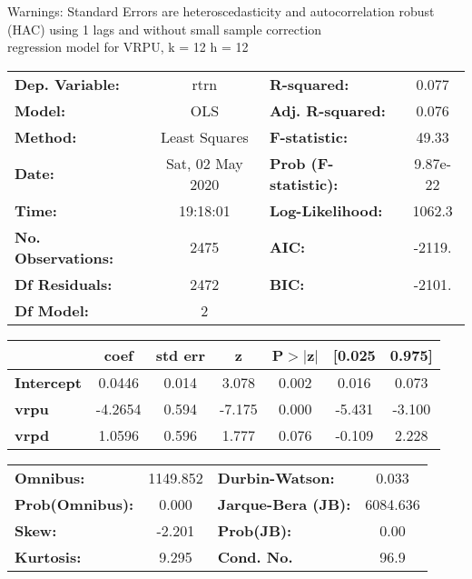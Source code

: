 Warnings: \newline
 [1] Standard Errors are heteroscedasticity and autocorrelation robust (HAC) using 1 lags and without small sample correction\\ 

regression model for VRPU, k = 12 h = 12\begin{center}
\begin{tabular}{lclc}
\toprule
\textbf{Dep. Variable:}    &       rtrn       & \textbf{  R-squared:         } &     0.077   \\
\textbf{Model:}            &       OLS        & \textbf{  Adj. R-squared:    } &     0.076   \\
\textbf{Method:}           &  Least Squares   & \textbf{  F-statistic:       } &     49.33   \\
\textbf{Date:}             & Sat, 02 May 2020 & \textbf{  Prob (F-statistic):} &  9.87e-22   \\
\textbf{Time:}             &     19:18:01     & \textbf{  Log-Likelihood:    } &    1062.3   \\
\textbf{No. Observations:} &        2475      & \textbf{  AIC:               } &    -2119.   \\
\textbf{Df Residuals:}     &        2472      & \textbf{  BIC:               } &    -2101.   \\
\textbf{Df Model:}         &           2      & \textbf{                     } &             \\
\bottomrule
\end{tabular}
\begin{tabular}{lcccccc}
                   & \textbf{coef} & \textbf{std err} & \textbf{z} & \textbf{P$> |$z$|$} & \textbf{[0.025} & \textbf{0.975]}  \\
\midrule
\textbf{Intercept} &       0.0446  &        0.014     &     3.078  &         0.002        &        0.016    &        0.073     \\
\textbf{vrpu}      &      -4.2654  &        0.594     &    -7.175  &         0.000        &       -5.431    &       -3.100     \\
\textbf{vrpd}      &       1.0596  &        0.596     &     1.777  &         0.076        &       -0.109    &        2.228     \\
\bottomrule
\end{tabular}
\begin{tabular}{lclc}
\textbf{Omnibus:}       & 1149.852 & \textbf{  Durbin-Watson:     } &    0.033  \\
\textbf{Prob(Omnibus):} &   0.000  & \textbf{  Jarque-Bera (JB):  } & 6084.636  \\
\textbf{Skew:}          &  -2.201  & \textbf{  Prob(JB):          } &     0.00  \\
\textbf{Kurtosis:}      &   9.295  & \textbf{  Cond. No.          } &     96.9  \\
\bottomrule
\end{tabular}
\end{center}

